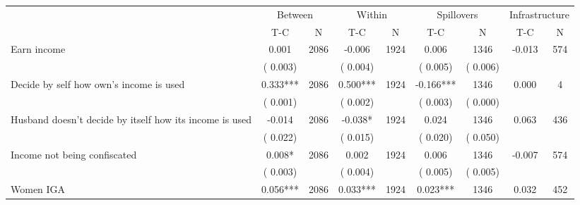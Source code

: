 
\begin{tabular}{l*{8}{c}}\hline&\multicolumn{2}{c}{Between}&\multicolumn{2}{c}{Within}&\multicolumn{2}{c}{Spillovers}&\multicolumn{2}{c}{Infrastructure}\\ \cmidrule(r){2-3}\cmidrule(l){4-5}\cmidrule(l){6-7}\cmidrule(l){8-9} & {T-C} & {N} & {T-C} & {N}  & {T-C}  & {N} & {T-C}  & {N} \\ \midrule
Earn income        &              0.001      &       2086       &             -0.006      &       1924       &              0.006      &       1346  &       -0.013 &       574       \\
                       &       (       0.003)            &                               &       (       0.004)            &                               &       (       0.005)            &       (       0.006) &                  \\
Decide by self how own's income is used        &              0.333***      &       2086       &              0.500***      &       1924       &             -0.166***      &       1346  &        0.000 &       4       \\
                       &       (       0.001)            &                               &       (       0.002)            &                               &       (       0.003)            &       (       0.000) &                  \\
Husband doesn't decide by itself how its income is used        &             -0.014      &       2086       &             -0.038*      &       1924       &              0.024      &       1346  &        0.063 &       436       \\
                       &       (       0.022)            &                               &       (       0.015)            &                               &       (       0.020)            &       (       0.050) &                  \\
Income not being confiscated        &              0.008*      &       2086       &              0.002      &       1924       &              0.006      &       1346  &       -0.007 &       574       \\
                       &       (       0.003)            &                               &       (       0.004)            &                               &       (       0.005)            &       (       0.005) &                  \\
Women IGA        &              0.056***      &       2086       &              0.033***      &       1924       &              0.023***      &       1346  &        0.032 &       452       \\

\end{tabular}
